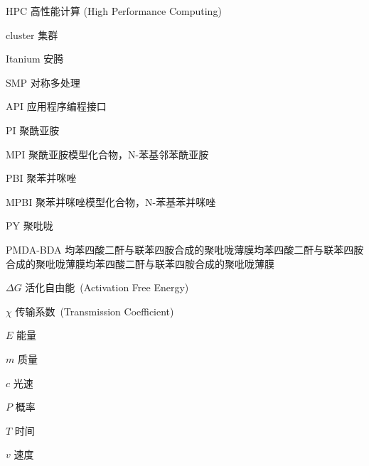 \begin{denotation}

\item[HPC] 高性能计算 (High Performance Computing)
\item[cluster] 集群
\item[Itanium] 安腾
\item[SMP] 对称多处理
\item[API] 应用程序编程接口
\item[PI]	聚酰亚胺
\item[MPI]	聚酰亚胺模型化合物，N-苯基邻苯酰亚胺
\item[PBI]	聚苯并咪唑
\item[MPBI]	聚苯并咪唑模型化合物，N-苯基苯并咪唑
\item[PY]	聚吡咙
\item[PMDA-BDA]	均苯四酸二酐与联苯四胺合成的聚吡咙薄膜均苯四酸二酐与联苯四胺合成的聚吡咙薄膜均苯四酸二酐与联苯四胺合成的聚吡咙薄膜
\item[$\Delta G$]  	活化自由能~(Activation Free Energy)
\item [$\chi$] 传输系数~(Transmission Coefficient)
\item[$E$] 能量
\item[$m$] 质量
\item[$c$] 光速
\item[$P$] 概率
\item[$T$] 时间
\item[$v$] 速度
\end{denotation}
